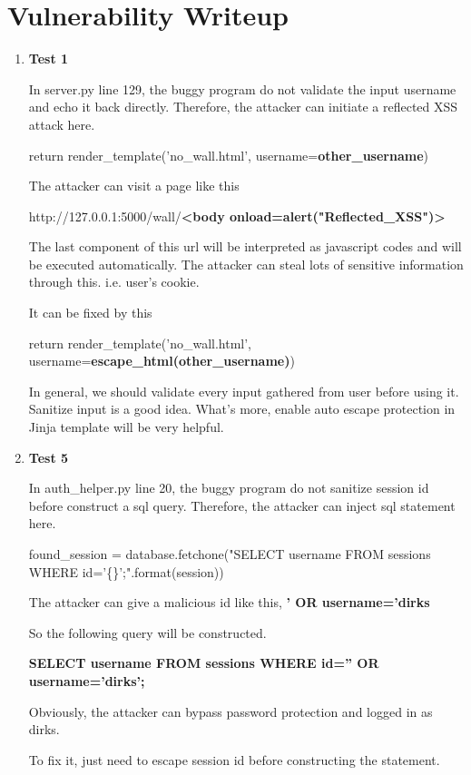 \documentclass[11pt]{article}
\newenvironment{qparts}{\begin{enumerate}[{(}a{)}]}{\end{enumerate}}
\begin{document}
\newpage
\section{Vulnerability Writeup}
\begin{qparts}
	\item \textbf{Test 1}
	
	In server.py line 129, the buggy program do not validate the input username and echo it back directly. Therefore, the attacker can initiate a reflected XSS attack here.
	
	return render\_template('no\_wall.html', username=\textbf{other\_username})
	
	The attacker can visit a page like this
	
	http://127.0.0.1:5000/wall/\textbf{\textless body onload=alert("Reflected\_XSS")\textgreater}
	
	The last component of this url will be interpreted as javascript codes and will be executed automatically. The attacker can steal lots of sensitive information through this. i.e. user's cookie.
	
	It can be fixed by this
	
	return render\_template('no\_wall.html', username=\textbf{escape\_html(other\_username)})
	
	In general, we should validate every input gathered from user before using it. Sanitize input is a good idea. What's more, enable auto escape protection in Jinja template will be very helpful.
	
	\item \textbf{Test 5}
	
	In auth\_helper.py line 20, the buggy program do not sanitize session id before construct a sql query. Therefore, the attacker can inject sql statement here.
	
	found\_session = database.fetchone("SELECT username FROM sessions WHERE id='\{\}';".format(session))
	
	The attacker can give a malicious id like this, \textbf{' OR username='dirks}
	
	So the following query will be constructed. 
	
	\textbf{SELECT username FROM sessions WHERE id='' OR username='dirks';}
	
	Obviously, the attacker can bypass password protection and logged in as dirks.
	
	To fix it, just need to escape session id before constructing the statement.
	

\end{qparts}
\end{document}
